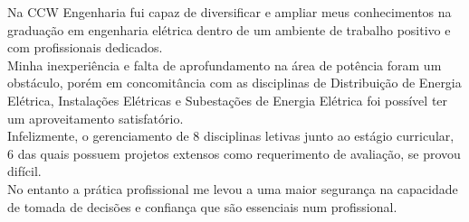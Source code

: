 Na CCW Engenharia fui capaz de diversificar e ampliar meus conhecimentos na graduação em engenharia elétrica dentro de um ambiente de trabalho positivo e com profissionais dedicados.\\ 


Minha inexperiência e falta de aprofundamento na área de potência foram um obstáculo, porém em concomitância com as disciplinas de Distribuição de Energia Elétrica, Instalações Elétricas e Subestações de Energia Elétrica foi possível ter um aproveitamento satisfatório.\\


Infelizmente, o gerenciamento de 8 disciplinas letivas junto ao estágio curricular, 6 das quais possuem projetos extensos como requerimento de avaliação, se provou difícil.\\


No entanto a prática profissional me levou a uma maior segurança na capacidade de tomada de decisões e confiança que são essenciais num profissional. \\